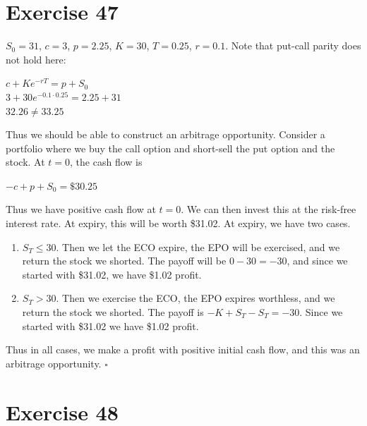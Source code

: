 \documentclass{article}
\begin{document}
\section*{Exercise 47}
\begin{flushleft}
    $S_0 = 31$, $c = 3$, $p = 2.25$, $K = 30$, $T = 0.25$, $r=0.1$.
    Note that put-call parity does not hold here:
    \begin{center}
        $c + Ke^{-rT} = p + S_0$ \\
        $3 + 30e^{-0.1 \cdot 0.25} = 2.25 + 31$ \\
        $32.26 \neq 33.25$
    \end{center}
    Thus we should be able to construct an arbitrage opportunity. Consider a portfolio where
    we buy the call option and short-sell the put option and the stock. At $t=0$, the cash flow is
    \begin{center}
        $-c + p + S_0 = \$30.25$
    \end{center}
    Thus we have positive cash flow at $t=0$. We can then invest this at the risk-free interest rate. At expiry, this will be worth \$31.02. At expiry, we have two cases.
    \begin{enumerate}
        \item $S_T \leq 30$. Then we let the ECO expire, the EPO will be exercised, and we return the stock we shorted. The payoff will be $0 - 30 = -30$,
                and since we started with \$31.02, we have \$1.02 profit.
        \item $S_T > 30$. Then we exercise the ECO, the EPO expires worthless, and we return the stock we shorted. The payoff is $-K + S_T - S_T = -30$.
                Since we started with \$31.02 we have \$1.02 profit.
    \end{enumerate}
    Thus in all cases, we make a profit with positive initial cash flow, and this was an arbitrage opportunity. $\square$
\end{flushleft}

\section*{Exercise 48}
\end{document}

